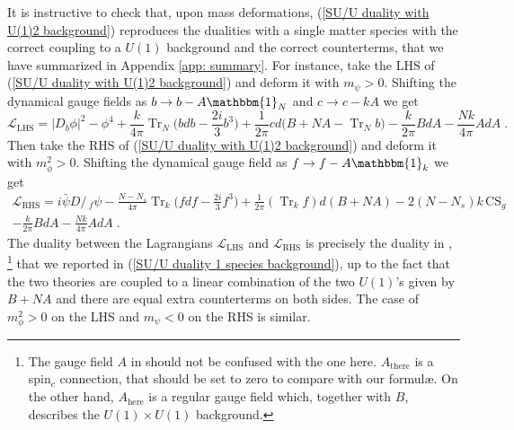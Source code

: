 \documentclass[a4paper, 12pt]{article}
\numberwithin{equation}{section}
\newcommand{\Dslash}{D\!\!\!\!\slash\,}
\newcommand{\be}{\begin{equation}} \newcommand{\ee}{\end{equation}}
\newcommand{\cL}{\mathcal{L}}
\newcommand{\unit}{\mathbbm{1}}
\DeclareMathOperator{\Tr}{Tr}
\begin{document}
It is instructive to check that, upon mass deformations, (\ref{SU/U duality with U(1)2 background}) reproduces the dualities with a single matter species with the correct coupling to a $U(1)$ background and the correct counterterms, that we have summarized in Appendix \ref{app: summary}. For instance, take the LHS of (\ref{SU/U duality with U(1)2 background}) and deform it with \mbox{$m_\psi>0$}.{} Shifting the dynamical gauge fields as $b \to b - A \unit_N$ and $c \to c - kA$ we get
\be
\cL_\text{LHS} = |D_b\phi|^2 - \phi^4 + \frac{k}{4\pi} \Tr_N \Big( bdb- \frac{2i}3 b^3 \Big) + \frac1{2\pi} cd\big( B + NA - \Tr_N b \big) - \frac{k}{2\pi} BdA - \frac{Nk}{4\pi} AdA \;.
\ee
Then take the RHS of (\ref{SU/U duality with U(1)2 background}) and deform it with $m_\phi^2>0$. Shifting the dynamical gauge field as $f \to f - A\unit_k$ we get
\begin{multline}
\cL_\text{RHS} = i \bar\psi \Dslash_f \psi - \frac{N-N_s}{4\pi} \Tr_k \Big( fdf - \frac{2i}3 f^3 \Big) + \frac1{2\pi} (\Tr_k f) d(B + N A) - 2(N-N_s) k \, \text{CS}_g \\
- \frac{k}{2\pi} BdA - \frac{Nk}{4\pi} AdA \;.
\end{multline}
The duality between the Lagrangians $\cL_\text{LHS}$ and $\cL_\text{RHS}$ is precisely the duality in \cite{Hsin:2016blu},%
\footnote{The gauge field $A$ in \cite{Hsin:2016blu} should not be confused with the one here. $A_\text{there}$ is a spin$_c$ connection, that should be set to zero to compare with our formul\ae. On the other hand, $A_\text{here}$ is a regular gauge field which, together with $B$, describes the $U(1) \times U(1)$ background.}
that we reported in (\ref{SU/U duality 1 species background}), up to the fact that the two theories are coupled to a linear combination of the two $U(1)$'s given by $B + NA$ and there are equal extra counterterms on both sides. The case of $m_\phi^2>0$ on the LHS and $m_\psi<0$ on the RHS is similar.
\end{document}
